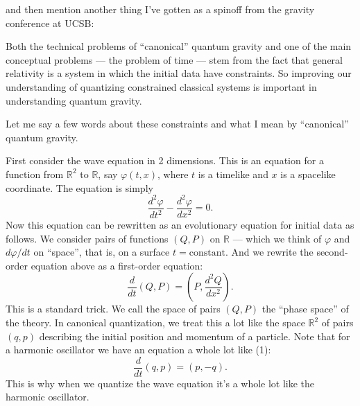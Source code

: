 \documentclass[12pt]{article}
\def\tightlist{}
\renewcommand{\texttt}[1]{%
  \begingroup
  \ttfamily
  \begingroup\lccode`~=`/\lowercase{\endgroup\def~}{/\discretionary{}{}{}}%
  \begingroup\lccode`~=`[\lowercase{\endgroup\def~}{[\discretionary{}{}{}}%
  \begingroup\lccode`~=`.\lowercase{\endgroup\def~}{.\discretionary{}{}{}}%
  \catcode`/=\active\catcode`[=\active\catcode`.=\active
  \scantokens{#1\noexpand}%
  \endgroup
}
\begin{document}
\noindent
and then mention another thing I've gotten as a spinoff from the gravity
conference at UCSB:


Both the technical problems of ``canonical'' quantum gravity and one of
the main conceptual problems --- the problem of time --- stem from the
fact that general relativity is a system in which the initial data have
constraints. So improving our understanding of quantizing constrained
classical systems is important in understanding quantum gravity.

Let me say a few words about these constraints and what I mean by
``canonical'' quantum gravity.

First consider the wave equation in 2 dimensions. This is an equation
for a function from \(\mathbb{R}^2\) to \(\mathbb{R}\), say
\(\varphi(t,x)\), where \(t\) is a timelike and \(x\) is a spacelike
coordinate. The equation is simply
\[\frac{d^2\varphi}{dt^2} -\frac{d^2\varphi}{dx^2} = 0.\] Now this
equation can be rewritten as an evolutionary equation for initial data
as follows. We consider pairs of functions \((Q,P)\) on \(\mathbb{R}\)
--- which we think of \(\varphi\) and \(d\varphi/dt\) on ``space'', that
is, on a surface \(t = \text{constant}\). And we rewrite the
second-order equation above as a first-order equation:
\[\frac{d}{dt}(Q,P) = \left(P,\frac{d^2Q}{dx^2}\right).\tag{1}\] This is
a standard trick. We call the space of pairs \((Q,P)\) the ``phase
space'' of the theory. In canonical quantization, we treat this a lot
like the space \(\mathbb{R}^2\) of pairs \((q,p)\) describing the
initial position and momentum of a particle. Note that for a harmonic
oscillator we have an equation a whole lot like (1):
\[\frac{d}{dt}(q,p) = (p,-q).\] This is why when we quantize the wave
equation it's a whole lot like the harmonic oscillator.
\end{document}
